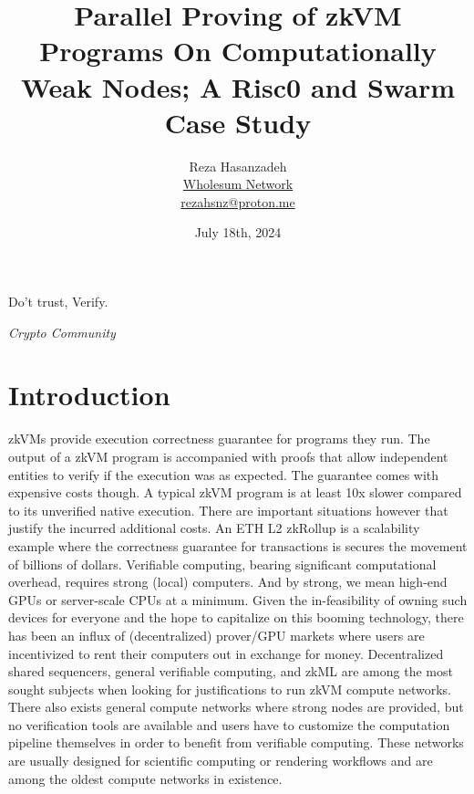 \documentclass[a4paper, 10pt]{article}
\begin{document}
\title{Parallel Proving of zkVM Programs On Computationally Weak Nodes; A Risc0 and Swarm Case Study}
\author{
	\small{Reza Hasanzadeh}\\
	\footnotesize{\href{https://github.com/WholesumNet}{Wholesum Network}}\\	
	\href{mailto:rezahsnz@proton.me}{\footnotesize{rezahsnz@proton.me}}
}
\date{\footnotesize{July 18th, 2024}}
\maketitle

\epigraph{Do't trust, Verify.}{\textit{ \textit{Crypto Community}}}

\section{Introduction}
zkVMs provide execution correctness guarantee for programs they run. The output of a zkVM program is accompanied with proofs that allow independent entities to verify if the execution was as expected. The guarantee comes with expensive costs though. A typical zkVM program is at least 10x slower compared to its unverified native execution. There are important situations however that justify the incurred additional costs. An ETH L2 zkRollup is a scalability example where the correctness guarantee for transactions is secures the movement of billions of dollars. Verifiable computing, bearing significant computational overhead, requires strong (local) computers. And by strong, we mean high-end GPUs or server-scale CPUs at a minimum. Given the in-feasibility of owning such devices for everyone and the hope to capitalize on this booming technology, there has been an influx of (decentralized) prover/GPU markets where users are incentivized to rent their computers out in exchange for money. Decentralized shared sequencers, general verifiable computing, and zkML are among the most sought subjects when looking for justifications to run zkVM compute networks. There also exists general compute networks where strong nodes are provided, but no verification tools are available and users have to customize the computation pipeline themselves in order to benefit from verifiable computing. These networks are usually designed for scientific computing or rendering workflows and are among the oldest compute networks in existence.
\par
\end{document}
